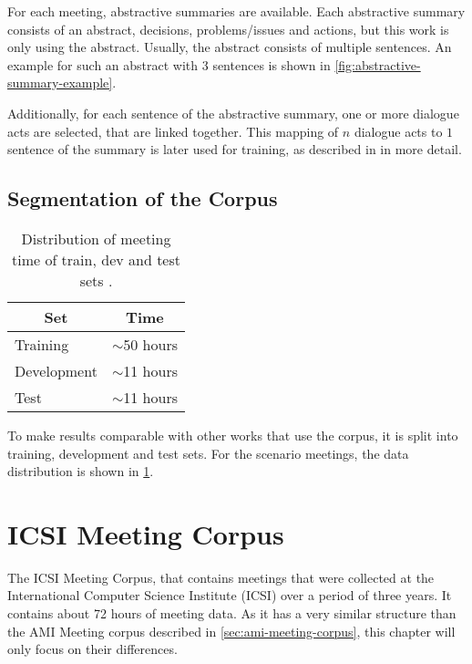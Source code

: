 For each meeting, abstractive summaries are available.
Each abstractive summary consists of an abstract, decisions, problems/issues and actions, but this work is only using the abstract.
Usually, the abstract consists of multiple sentences.
An example for such an abstract with 3 sentences is shown in \cref{fig:abstractive-summary-example}.

Additionally, for each sentence of the abstractive summary, one or more dialogue acts are selected, that are linked together.
This mapping of $n$ dialogue acts to $1$ sentence of the summary is later used for training, as described in \label{sec:concept-training} in more detail. \cite{amiWebsite}

\subsection{Segmentation of the Corpus}\label{ssec:ami-segmentation-of-the-corpus}

\begin{table}[h]
\centering
\begin{tabular}{@{}ll@{}}
\toprule
\multicolumn{1}{c}{Set} & \multicolumn{1}{c}{Time} \\ \midrule
Training & $\sim$50 hours \\
Development & $\sim$11 hours \\
Test & $\sim$11 hours \\ \bottomrule
\end{tabular}
\caption[Distribution of meeting time of train, dev and test sets]{Distribution of meeting time of train, dev and test sets \cite{amiWebsite}.}
\label{tab:meeting-time-distribution}
\end{table}

To make results comparable with other works that use the corpus, it is split into training, development and test sets.
For the scenario meetings, the data distribution is shown in \cref{tab:meeting-time-distribution}. \cite{amiWebsite}


\section{ICSI Meeting Corpus}

The ICSI Meeting Corpus, that contains meetings that were collected at the International Computer Science Institute (ICSI) over a period of three years.
It contains about 72 hours of meeting data. \cite{Janin}
As it has a very similar structure than the AMI Meeting corpus described in \cref{sec:ami-meeting-corpus}, this chapter will only focus on their differences.

